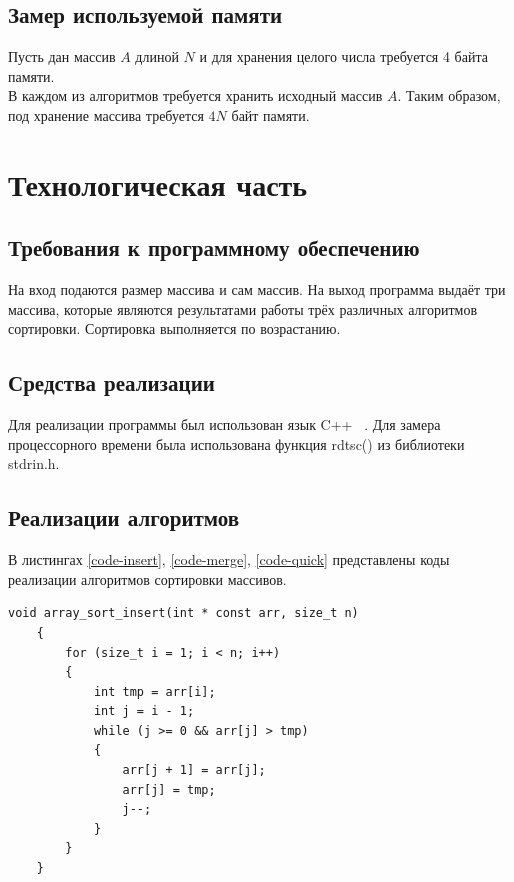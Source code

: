 \documentclass[12pt, a4paper]{report}
\begin{document}
	\section{Замер используемой памяти}
	Пусть дан массив $A$ длиной $N$ и для хранения целого числа требуется 4 байта памяти.\\
	В каждом из алгоритмов требуется хранить исходный массив $A$. Таким образом, под хранение массива требуется $4N$ байт памяти.\\
	
	\chapter{Технологическая часть}
	\section{Требования к программному обеспечению}
	На вход подаются размер массива и сам массив. На выход программа выдаёт три массива, которые являются результатами работы трёх различных алгоритмов сортировки. Сортировка выполняется по возрастанию.
	\section{Средства реализации}
	Для реализации программы был использован язык C++ ~\cite{CPP}. Для замера процессорного времени была использована функция rdtsc() из библиотеки stdrin.h.
	\section{Реализации алгоритмов}
	В листингах \ref{code-insert}, \ref{code-merge}, \ref{code-quick} представлены коды реализации алгоритмов сортировки массивов.
	\begin{lstlisting}[label=code-insert,caption=Сортировка вставками]
	void array_sort_insert(int * const arr, size_t n)
	{
		for (size_t i = 1; i < n; i++)
		{
			int tmp = arr[i];
			int j = i - 1;
			while (j >= 0 && arr[j] > tmp)
			{
				arr[j + 1] = arr[j];
				arr[j] = tmp;
				j--;
			}
		}
	}
	\end{lstlisting}
\end{document}

